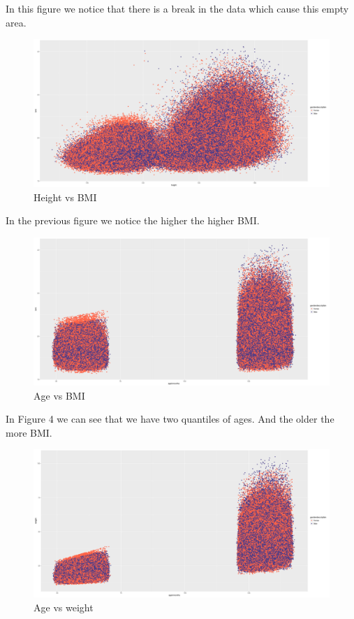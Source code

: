 \documentclass{article}
\begin{document}
	In this figure we notice that there is a break in the data which cause this empty area.
\begin{figure}[H]
	\begin{center}
		\includegraphics[scale=0.3]{heightBMI.png}
	\end{center}
	\caption{Height vs BMI}
\end{figure}
In the previous figure we notice the higher the higher BMI.
\begin{figure}[H]
	\begin{center}
		\includegraphics[scale=0.3]{ageBMI.png}
	\end{center}
	\caption{Age vs BMI}
\end{figure}
In Figure 4 we can see that we have two quantiles of ages. And the older the more BMI.
\begin{figure}[H]
	\begin{center}
		\includegraphics[scale=0.3]{ageweight.png}
	\end{center}
	\caption{Age vs weight}
\end{figure}
\end{document}
